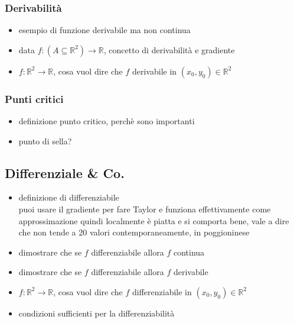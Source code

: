 \documentclass[11pt]{article}
\begin{document}
\subsubsection{Derivabilità}
\label{sec:orgb5a8823}
\begin{itemize}
\item esempio di funzione derivabile ma non continua
\item data \(f : (A \subseteq \mathbb{R}^2) \to \mathbb{R}\), concetto di derivabilità e gradiente
\item \(f : \mathbb{R}^2 \to \mathbb{R}\), cosa vuol dire che \(f\) derivabile in
\((x_0, y_0) \in \mathbb{R}^2\)
\end{itemize}

\subsubsection{Punti critici}
\label{sec:orgb463bdf}
\begin{itemize}
\item definizione punto critico, perchè sono importanti
\item punto di sella?
\end{itemize}

\subsection{Differenziale \& Co.}
\label{sec:org2bbf26a}
\begin{itemize}
\item definizione di differenziabile \\
puoi usare il gradiente per fare Taylor e funziona effettivamente come approssimazione
quindi localmente è piatta e si comporta bene, vale a dire che non tende a 20 valori
contemporaneamente, in poggioninese
\end{itemize}


\begin{itemize}
\item dimostrare che se \(f\) differenziabile allora \(f\) continua
\item dimostrare che se \(f\) differenziabile allora \(f\) derivabile
\item \(f : \mathbb{R}^2 \to \mathbb{R}\), cosa vuol dire che \(f\) differenziabile in
\((x_0, y_0) \in \mathbb{R}^2\)
\item condizioni sufficienti per la differenziabilità
\end{itemize}
\end{document}

